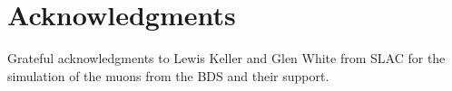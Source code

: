\documentclass[12pt]{article}
\begin{document}





\section*{Acknowledgments}
Grateful acknowledgments to Lewis Keller and Glen White from SLAC for the simulation of the muons from the BDS and their support.

%




\end{document}
